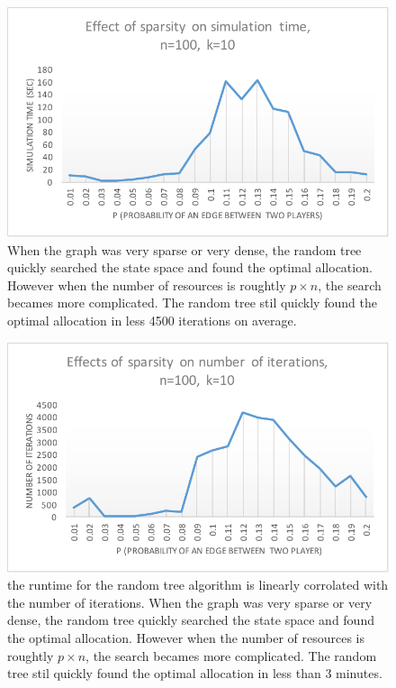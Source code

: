 \begin{figure}[htb]
\begin{center}
\includegraphics[width=.4\textwidth]{result-3}
\end{center}
\caption{When the graph was very sparse or very dense, the random tree quickly searched the state space and found the optimal allocation. However when the number of resources is roughtly $p\times n$, the search becames more complicated. The random tree stil quickly found the optimal allocation in less 4500 iterations on average. }
\label{fig:result3}
\end{figure}

\begin{figure}[htb]
\begin{center}
\includegraphics[width=.4\textwidth]{result-4}
\end{center}
\caption{the runtime for the random tree algorithm is linearly corrolated with the number of iterations. When the graph was very sparse or very dense, the random tree quickly searched the state space and found the optimal allocation. However when the number of resources is roughtly $p\times n$, the search becames more complicated. The random tree stil quickly found the optimal allocation in less than 3 minutes.}
\label{fig:result4}
\end{figure}

